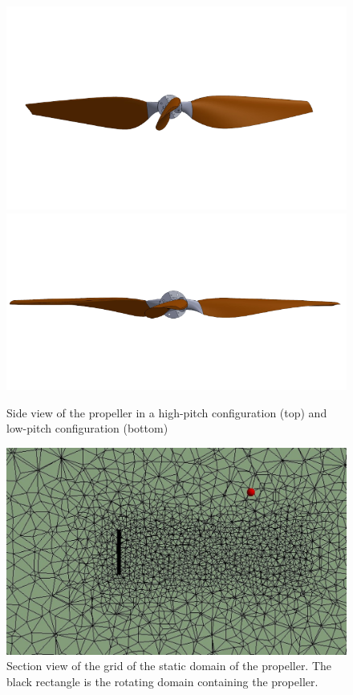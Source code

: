  
\begin{figure}[!htbp]
    \centering
    \includegraphics{images/part10.1/highpitch-removebg-preview.png}
    \includegraphics{images/part10.1/lowpitch-removebg-preview.png}
    \caption{Side view of the propeller in a high-pitch configuration (top) and low-pitch configuration (bottom)}
    \label{fig:pitches}
\end{figure}

\begin{figure}[!htbp]
    \centering
    \includegraphics{images/part10.1/propdomain.jpg}
    \caption{Section view of the grid of the static domain of the propeller. The black rectangle is the rotating domain containing the propeller.}
    \label{fig:propellersidemesh}
\end{figure}

